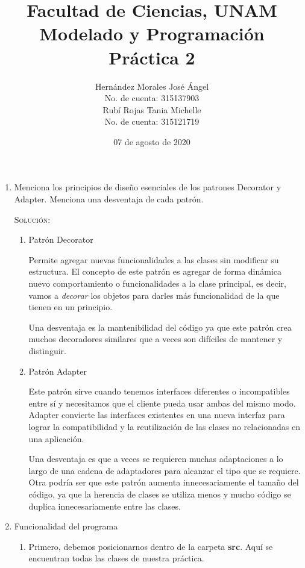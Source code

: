 \documentclass[letterpaper,11pt]{article}
\title{Facultad de Ciencias, UNAM \\ Modelado y Programación \\ Práctica 2}
\author{Hernández Morales José Ángel \\ No. de cuenta: 315137903 \\ 
        Rubí Rojas Tania Michelle \\ No. de cuenta: 315121719}
\date{07 de agosto de 2020}
\begin{document}
\maketitle

\begin{enumerate}
    \item Menciona los principios de diseño esenciales de los patrones Decorator 
    y Adapter. Menciona una desventaja de cada patrón.

    \textsc{Solución:}
    \begin{enumerate}
        \item Patrón Decorator 
        
        Permite agregar nuevas funcionalidades a las clases sin modificar su 
        estructura. El concepto de este patrón es agregar de forma dinámica 
        nuevo comportamiento o funcionalidades a la clase principal, es decir, 
        vamos a \textit{decorar} los objetos para darles más funcionalidad de 
        la que tienen en un principio.

        Una desventaja es la mantenibilidad del código ya que este patrón crea 
        muchos decoradores similares que a veces son difíciles de mantener y 
        distinguir. 

        \item Patrón Adapter
        
        Este patrón sirve cuando tenemos interfaces diferentes o incompatibles 
        entre sí y necesitamos que el cliente pueda usar ambas del mismo 
        modo. Adapter convierte las interfaces existentes en una nueva interfaz 
        para lograr la compatibilidad y la reutilización de las clases no 
        relacionadas en una aplicación.

        Una desventaja es que a veces se requieren muchas adaptaciones a lo 
        largo de una cadena de adaptadores para alcanzar el tipo que se 
        requiere. Otra podría ser que este patrón aumenta innecesariamente 
        el tamaño del código, ya que la herencia de clases se utiliza menos 
        y mucho código se duplica innecesariamente entre las clases. 
    \end{enumerate}

    \item Funcionalidad del programa
    \begin{enumerate}
        \item Primero, debemos posicionarnos dentro de la carpeta \textbf{src}.
        Aquí se encuentran todas las clases de nuestra práctica.


\end{enumerate}
\end{enumerate}
\end{document}
